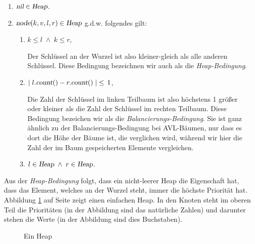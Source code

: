 \begin{enumerate}
\item $\textsl{nil} \in \textsl{Heap}$.
\item $\textsl{node}(k,v,l,r) \in \textsl{Heap}$ g.d.w. folgendes gilt:
      \begin{enumerate}
      \item $k \leq l \;\wedge\; k \leq r$,

            Der Schl\"ussel an der Wurzel ist also kleiner-gleich als alle anderen Schl\"ussel.
            Diese Bedingung bezeichnen wir auch als die \emph{Heap-Bedingung}.
      \item $\mid l.\textsl{count}() - r.\textsl{count}() \mid \;\leq\, 1$,

            Die Zahl der Schl\"ussel im linken Teilbaum ist also h\"ochstens 1 gr\"o{\ss}er oder
            kleiner als die Zahl der Schl\"ussel im rechten Teilbaum.
            Diese Bedingung bezeichen wir als die \emph{Balancierungs-Bedingung}.  Sie ist
            ganz \"ahnlich zu der Balancierungs-Bedingung bei AVL-B\"aumen, nur dass es dort
            die H\"ohe der B\"aume ist, die verglichen wird, w\"ahrend wir hier die Zahl der
            im Baum gespeicherten Elemente vergleichen.
      \item $l \in \textsl{Heap} \;\wedge\; r \in \textsl{Heap}$.
      \end{enumerate}
\end{enumerate}
Aus der \emph{Heap-Bedingung} folgt, dass ein nicht-leerer Heap die Eigenschaft hat, dass
das Element, welches an der Wurzel steht, immer die h\"ochste Priorit\"at hat.  Abbildung
\ref{fig:heap-list} auf Seite \pageref{fig:heap-list} zeigt einen einfachen Heap.
In den Knoten steht im oberen Teil die Priorit\"aten (in der Abbildung sind das nat\"urliche Zahlen) und
darunter stehen die Werte (in der Abbildung sind dies Buchstaben).

\begin{figure}[!t]
  \centering
  \caption{Ein Heap}
  \label{fig:heap-list}
\end{figure}


